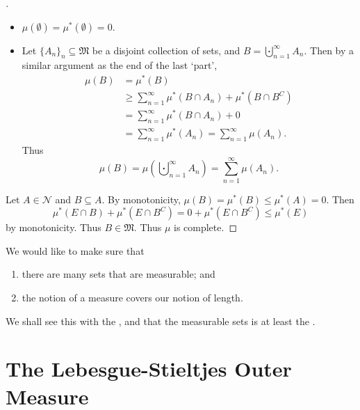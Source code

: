 \documentclass[notoc,notitlepage]{tufte-book}
\begin{document}
\begin{proof}[]
  \noindent
  \begin{itemize}
    \item $\mu(\emptyset) = \mu^*(\emptyset) = 0$.
    \item Let $\{ A_n \}_{n} \subseteq \mathfrak{M}$ be a disjoint collection
      of sets, and $B = \bigcupdot_{n=1}^{\infty} A_n$.
      Then by a similar argument as the end of the last `part',
      \begin{align*}
        \mu(B) &= \mu^*(B) \\
               &\geq \sum_{n=1}^{\infty} \mu^*(B \cap A_n) + \mu^*(B \cap B^C) \\
               &= \sum_{n=1}^{\infty} \mu^*(B \cap A_n) + 0 \\
               &= \sum_{n=1}^{\infty} \mu^*(A_n) = \sum_{n=1}^{\infty} \mu(A_n).
      \end{align*}
      Thus
      \begin{equation*}
        \mu(B) = \mu \left( \bigcupdot_{n=1}^{\infty} A_n \right)
             = \sum_{n=1}^{\infty} \mu(A_n).
      \end{equation*}
  \end{itemize}

  \noindent
  Let $A \in \mathcal{N}$ and $B \subseteq A$.
  By monotonicity, $\mu(B) = \mu^*(B) \leq \mu^*(A) = 0$.
  Then
  \begin{equation*}
    \mu^*(E \cap B) + \mu^*(E \cap B^C)
    = 0 + \mu^*(E \cap B^C) \leq \mu^*(E)
  \end{equation*}
  by monotonicity. Thus $B \in \mathfrak{M}$.
  Thus $\mu$ is complete.
\end{proof}

We would like to make sure that
\begin{enumerate}
  \item there are many sets that are measurable; and
  \item the notion of a measure covers our notion of length.
\end{enumerate}

We shall see this with the ,
and that the measurable sets is at least the .


\section{The Lebesgue-Stieltjes Outer Measure}%
\label{sec:the_lebesgue_stieltjes_outer_measure}
\end{document}
